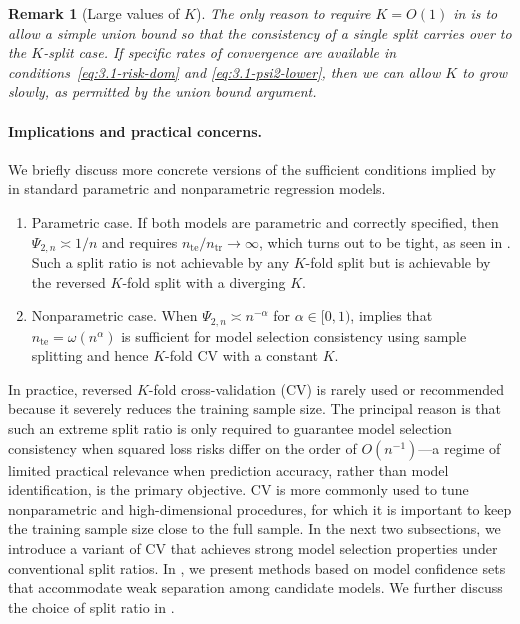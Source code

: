 \documentclass[11pt]{article}
\theoremstyle{plain}
\newtheorem{remark}[theorem]{Remark}
\newcommand{\tr}{{\mathrm{tr}}}
\newcommand{\te}{{\mathrm{te}}}
\begin{document}
\begin{remark}[Large values of $K$]\label{rem:3.1-diverging-K}
    The only reason to require $K=O(1)$ in  is to allow a simple union bound so that the consistency of a single split carries over to the $K$-split case.  If specific rates of convergence are available in conditions~\eqref{eq:3.1-risk-dom} and \eqref{eq:3.1-psi2-lower}, then we can allow $K$ to grow slowly, as permitted by the union bound argument.
\end{remark}


\paragraph{Implications and practical concerns.}
We briefly discuss more concrete versions of the sufficient conditions implied by  in standard parametric and nonparametric regression models.   
\begin{enumerate}
    \item Parametric case. If both models are parametric and correctly specified, then $\Psi_{2,n}\asymp 1/n$ and  requires $n_\te/n_\tr\rightarrow\infty$, which turns out to be tight, as seen in . Such a split ratio is not achievable by any $K$-fold split but is achievable by the reversed $K$-fold split with a diverging $K$. 
    \item Nonparametric case. When $\Psi_{2,n}\asymp n^{-\alpha}$ for $\alpha\in[0,1)$,  implies that $n_\te=\omega( n^{\alpha})$ is sufficient for model selection consistency using sample splitting and hence $K$-fold CV with a constant $K$.
\end{enumerate}
In practice, reversed $K$-fold cross-validation (CV) is rarely used or recommended because it severely reduces the training sample size. The principal reason is that such an extreme split ratio is only required to guarantee model selection consistency when squared loss risks differ on the order of $O(n^{-1})$---a regime of limited practical relevance when prediction accuracy, rather than model identification, is the primary objective. CV is more commonly used to tune nonparametric and high-dimensional procedures, for which it is important to keep the training sample size close to the full sample. In the next two subsections, we introduce a variant of CV that achieves strong model selection properties under conventional split ratios. In , we present methods based on model confidence sets that accommodate weak separation among candidate models. We further discuss the choice of split ratio in .
\end{document}
